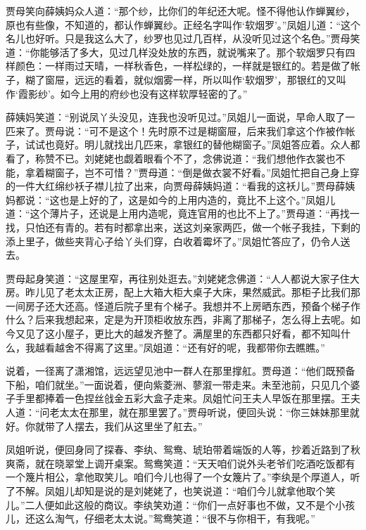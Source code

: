 贾母笑向薛姨妈众人道：``那个纱，比你们的年纪还大呢。怪不得他认作蝉翼纱，原也有些像，不知道的，都认作蝉翼纱。正经名字叫作`软烟罗'。''凤姐儿道：``这个名儿也好听。只是我这么大了，纱罗也见过几百样，从没听见过这个名色。''贾母笑道：``你能够活了多大，见过几样没处放的东西，就说嘴来了。那个软烟罗只有四样颜色：一样雨过天晴，一样秋香色，一样松绿的，一样就是银红的。若是做了帐子，糊了窗屉，远远的看着，就似烟雾一样，所以叫作`软烟罗'，那银红的又叫作`霞影纱'。如今上用的府纱也没有这样软厚轻密的了。''

薛姨妈笑道：``别说凤丫头没见，连我也没听见过。''凤姐儿一面说，早命人取了一匹来了。贾母说：``可不是这个！先时原不过是糊窗屉，后来我们拿这个作被作帐子，试试也竟好。明儿就找出几匹来，拿银红的替他糊窗子。''凤姐答应着。众人都看了，称赞不已。刘姥姥也觑着眼看个不了，念佛说道：``我们想他作衣裳也不能，拿着糊窗子，岂不可惜？''贾母道：``倒是做衣裳不好看。''凤姐忙把自己身上穿的一件大红绵纱袄子襟儿拉了出来，向贾母薛姨妈道：``看我的这袄儿。''贾母薛姨妈都说：``这也是上好的了，这是如今的上用内造的，竟比不上这个。''凤姐儿道：``这个薄片子，还说是上用内造呢，竟连官用的也比不上了。''贾母道：``再找一找，只怕还有青的。若有时都拿出来，送这刘亲家两匹，做一个帐子我挂，下剩的添上里子，做些夹背心子给丫头们穿，白收着霉坏了。''凤姐忙答应了，仍令人送去。

贾母起身笑道：``这屋里窄，再往别处逛去。''刘姥姥念佛道：``人人都说大家子住大房。昨儿见了老太太正房，配上大箱大柜大桌子大床，果然威武。那柜子比我们那一间房子还大还高。怪道后院子里有个梯子。我想并不上房晒东西，预备个梯子作什么？后来我想起来，定是为开顶柜收放东西，非离了那梯子，怎么得上去呢。如今又见了这小屋子，更比大的越发齐整了。满屋里的东西都只好看，都不知叫什么，我越看越舍不得离了这里。''凤姐道：``还有好的呢，我都带你去瞧瞧。''

说着，一径离了潇湘馆，远远望见池中一群人在那里撑舡。贾母道：``他们既预备下船，咱们就坐。''一面说着，便向紫菱洲、蓼溆一带走来。未至池前，只见几个婆子手里都捧着一色捏丝戗金五彩大盒子走来。凤姐忙问王夫人早饭在那里摆。王夫人道：``问老太太在那里，就在那里罢了。''贾母听说，便回头说：``你三妹妹那里就好。你就带了人摆去，我们从这里坐了舡去。''

凤姐听说，便回身同了探春、李纨、鸳鸯、琥珀带着端饭的人等，抄着近路到了秋爽斋，就在晓翠堂上调开桌案。鸳鸯笑道：``天天咱们说外头老爷们吃酒吃饭都有一个篾片相公，拿他取笑儿。咱们今儿也得了一个女篾片了。''李纨是个厚道人，听了不解。凤姐儿却知是说的是刘姥姥了，也笑说道：``咱们今儿就拿他取个笑儿。''二人便如此这般的商议。李纨笑劝道：``你们一点好事也不做，又不是个小孩儿，还这么淘气，仔细老太太说。''鸳鸯笑道：``很不与你相干，有我呢。''

